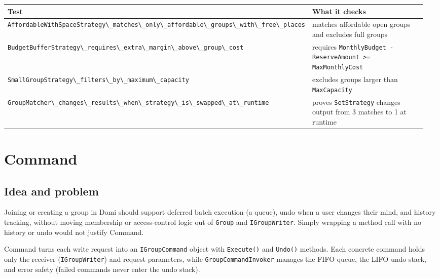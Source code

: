 \documentclass{utmreport}
\providecommand{\passthrough}[1]{#1}
\newcounter{none}
\begin{document}
{\def\LTcaptype{none} %
\begin{longtable}[]{@{}>{\raggedright\arraybackslash}p{0.480\linewidth}>{\raggedright\arraybackslash}p{0.480\linewidth}@{}}
\toprule\noalign{}
Test & What it checks \\
\midrule\noalign{}
\endhead
\bottomrule\noalign{}
\endlastfoot
\passthrough{\lstinline!AffordableWithSpaceStrategy\_matches\_only\_affordable\_groups\_with\_free\_places!} & matches affordable open groups and excludes full groups \\
\passthrough{\lstinline!BudgetBufferStrategy\_requires\_extra\_margin\_above\_group\_cost!} & requires \passthrough{\lstinline!MonthlyBudget - ReserveAmount >= MaxMonthlyCost!} \\
\passthrough{\lstinline!SmallGroupStrategy\_filters\_by\_maximum\_capacity!} & excludes groups larger than \passthrough{\lstinline!MaxCapacity!} \\
\passthrough{\lstinline!GroupMatcher\_changes\_results\_when\_strategy\_is\_swapped\_at\_runtime!} & proves \passthrough{\lstinline!SetStrategy!} changes output from 3 matches to 1 at runtime \\
\end{longtable}
}

\chapter{Command}

\section{Idea and problem}

Joining or creating a group in Domi should support deferred batch execution (a queue), undo when a user changes their mind, and history tracking, without moving membership or access-control logic out of \passthrough{\lstinline!Group!} and \passthrough{\lstinline!IGroupWriter!}. Simply wrapping a method call with no history or undo would not justify Command.

Command turns each write request into an \passthrough{\lstinline!IGroupCommand!} object with \passthrough{\lstinline!Execute()!} and \passthrough{\lstinline!Undo()!} methods. Each concrete command holds only the receiver (\passthrough{\lstinline!IGroupWriter!}) and request parameters, while \passthrough{\lstinline!GroupCommandInvoker!} manages the FIFO queue, the LIFO undo stack, and error safety (failed commands never enter the undo stack).
\end{document}

